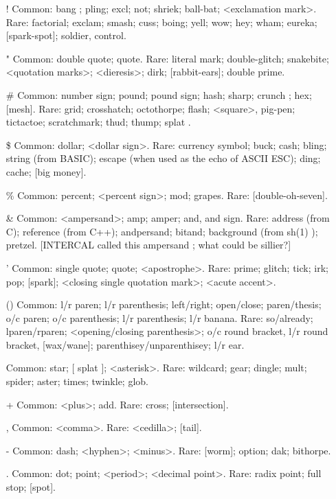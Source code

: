 \documentclass[10pt,twoside,openright]{memoir}
\begin{document}
{\footnotesize
\begin{itemize}

\item[{\ttfamily !}] Common: bang ; pling; excl; not; shriek; ball-bat; <exclamation mark>. Rare: factorial; exclam; smash; cuss; boing; yell; wow; hey; wham; eureka; [spark-spot]; soldier, control.
\item[{\ttfamily "}] Common: double quote; quote. Rare: literal mark; double-glitch; snakebite; <quotation marks>; <dieresis>; dirk; [rabbit-ears]; double prime.
\item[{\ttfamily \#}] Common: number sign; pound; pound sign; hash; sharp; crunch ; hex; [mesh]. Rare: grid; crosshatch; octothorpe; flash; <square>, pig-pen; tictactoe; scratchmark; thud; thump; splat .
\item[{\ttfamily \$}] Common: dollar; <dollar sign>. Rare: currency symbol; buck; cash; bling; string (from BASIC); escape (when used as the echo of ASCII ESC); ding; cache; [big money].
\item[{\ttfamily \%}] Common: percent; <percent sign>; mod; grapes. Rare: [double-oh-seven].
\item[{\ttfamily \&}] Common: <ampersand>; amp; amper; and, and sign. Rare: address (from C); reference (from C++); andpersand; bitand; background (from sh(1) ); pretzel. [INTERCAL called this ampersand ; what could be sillier?]
\item[{\ttfamily '}] Common: single quote; quote; <apostrophe>. Rare: prime; glitch; tick; irk; pop; [spark]; <closing single quotation mark>; <acute accent>.
\item[{\ttfamily ()}] Common: l/r paren; l/r parenthesis; left/right; open/close; paren/thesis; o/c paren; o/c parenthesis; l/r parenthesis; l/r banana. Rare: so/already; lparen/rparen; <opening/closing parenthesis>; o/c round bracket, l/r round bracket, [wax/wane]; parenthisey/unparenthisey; l/r ear.
\item[{\ttfamily *}] Common: star; [ splat ]; <asterisk>. Rare: wildcard; gear; dingle; mult; spider; aster; times; twinkle; glob.
\item[{\ttfamily +}] Common: <plus>; add. Rare: cross; [intersection].
\item[{\ttfamily ,}] Common: <comma>. Rare: <cedilla>; [tail].
\item[{\ttfamily -}] Common: dash; <hyphen>; <minus>. Rare: [worm]; option; dak; bithorpe.
\item[{\ttfamily .}] Common: dot; point; <period>; <decimal point>. Rare: radix point; full stop; [spot].

\end{itemize}}
\end{document}
